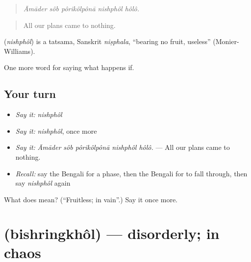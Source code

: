 \begin{quote}
    
\end{quote}

\begin{quote}
\emph{Āmāder sôb pôrikôlpônā nishphôl hôlô.}
\end{quote}

\begin{quote}
All our plans came to nothing.
\end{quote}

\begin{cousinweb}
\textbf{} (\emph{nishphôl}) is a tatsama, Sanskrit \emph{niṣphala}, \textquotedblleft{}bearing no fruit, useless\textquotedblright{} (Monier-Williams).
\end{cousinweb}

\begin{grammarlens}[title={What you've built}]
One more word for saying what happens if.
\end{grammarlens}

\subsection*{Your turn}
\begin{itemize}
\raggedright
  \item \emph{Say it:} \emph{nishphôl}
  \item \emph{Say it:} \emph{nishphôl}, once more
  \item \emph{Say it:} \emph{Āmāder sôb pôrikôlpônā nishphôl hôlô.} — All our plans came to nothing.
  \item \emph{Recall:} say the Bengali for a phase, then the Bengali for to fall through, then say \emph{nishphôl} again
\end{itemize}

\begin{tcolorbox}[breakable,colback=teal!4,colframe=teal!35!black,title={Before you move on}]
What does  mean? (\textquotedblleft{}Fruitless; in vain\textquotedblright{}.) Say it once more.
\end{tcolorbox}
\section[\texorpdfstring{\bn{বিশৃঙ্খল} (bishringkhôl)}{বিশৃঙ্খল (bishringkhôl)}]{ (bishringkhôl) — disorderly; in chaos}

\label{lesson:BN-C542-bishringkhol}



